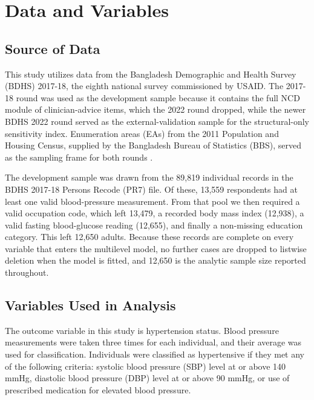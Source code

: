 \documentclass[
  12pt,
  a4paper]{article}
\begin{document}
\section{Data and Variables}\label{data-and-variables}

\subsection{Source of Data}\label{source-of-data}

This study utilizes data from the Bangladesh Demographic and Health Survey (BDHS) 2017-18, the eighth national survey commissioned by USAID. The 2017-18 round was used as the development sample because it contains the full NCD module of clinician-advice items, which the 2022 round dropped, while the newer BDHS 2022 round served as the external-validation sample for the structural-only sensitivity index. Enumeration areas (EAs) from the 2011 Population and Housing Census, supplied by the Bangladesh Bureau of Statistics (BBS), served as the sampling frame for both rounds \citep{bdhs2018misc}.

The development sample was drawn from the 89,819 individual records in the BDHS 2017-18 Persons Recode (PR7) file. Of these, 13,559 respondents had at least one valid blood-pressure measurement. From that pool we then required a valid occupation code, which left 13,479, a recorded body mass index (12,938), a valid fasting blood-glucose reading (12,655), and finally a non-missing education category. This left 12,650 adults. Because these records are complete on every variable that enters the multilevel model, no further cases are dropped to listwise deletion when the model is fitted, and 12,650 is the analytic sample size reported throughout.

\subsection{Variables Used in Analysis}\label{variables-used-in-analysis}

The outcome variable in this study is hypertension status. Blood pressure measurements were taken three times for each individual, and their average was used for classification. Individuals were classified as hypertensive if they met any of the following criteria: systolic blood pressure (SBP) level at or above 140 mmHg, diastolic blood pressure (DBP) level at or above 90 mmHg, or use of prescribed medication for elevated blood pressure.
\end{document}
